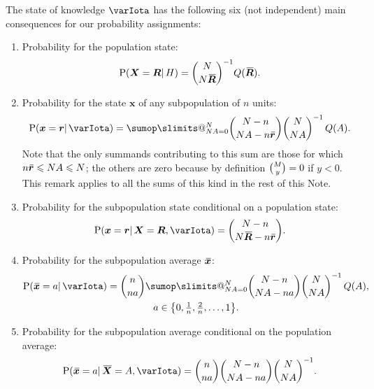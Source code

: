 \documentclass{article}
\makeatletter
\theoremstyle{remark}
\theoremstyle{innote}
\def\sum{\DOTSI\sumop\slimits@}
\renewcommand*{\|}{\mathpunct{|}}%
\renewcommand{\le}{\leqslant}%
\DeclarePairedDelimiter\set{\{}{\}}
\newcommand*{\p}{\mathrm{P}}%
\theoremstyle{simple}
\newcommand*{\widebar}[1]{{\mkern1.5mu\skew{2}\overline{\mkern-1.5mu#1\mkern-1.5mu}\mkern 1.5mu}}
\newcommand*{\av}{\widebar} %
\newcommand*{\sav}{\widebar} %
\newcommand*{\yxx}{x}%
\newcommand*{\yx}{\bm{\yxx}}%
\newcommand*{\yxs}{\sav{\yx}}%
\newcommand*{\yX}{\bm{X}}%
\newcommand*{\yXf}{\av{\yX}}%
\newcommand*{\yr}{\bm{r}}%
\newcommand*{\yrs}{\sav{\yr}}%
\newcommand*{\yR}{\bm{R}}%
\newcommand*{\yRf}{\av{\yR}}%
\newcommand*{\yH}{\varIota}
\makeatother
\begin{document}
The state of knowledge $\yH$ has the following six (not independent) main
consequences for our probability assignments:

\begin{enumerate}%
  \medskip\item\label{item:tot_plaus}Probability for the population state:
\begin{equation}
  \label{eq:joint_plaus_N_homog}
  \p(\yX = \yR \| H) = \binom{N}{N\yRf}^{-1} Q(\yRf).
\end{equation}

\medskip
\item\label{item:marginal}Probability for the state $\yx$ of any subpopulation
  of $n$ units:
\begin{equation}
  \label{eq:marginal}
    \p(\yx = \yr \| \yH) =
\sum_{N A =0}^{N} 
\binom{N-n}{N A-n\yrs}\binom{N}{N A}^{-1}\,
Q(A).
\end{equation}
Note that the only summands contributing to this sum are those for which
$n\yrs \le NA \le N$; the others are zero because by definition
$\tbinom{M}{y}=0$ if $y<0$. This remark applies to all the sums of this
kind in the rest of this Note.

\medskip
\item\label{item:conditional}Probability for the subpopulation
  state conditional on a population state:
\begin{equation}
  \label{eq:conditional_total_state}
  \p(\yx = \yr \| \yX = \yR, \yH)
=
\binom{N-n}{N \yRf-n \yrs}.
\end{equation}

\medskip
\item\label{item:marginal_average}Probability for the
  subpopulation average $\yxs$:
\begin{multline}
  \label{eq:subpop_average}
  \p(\yxs = a  \| \yH) = \binom{n}{n a}
 \sum_{N A=0}^{N}
\binom{N-n}{N A-n a}\binom{N}{N A}^{-1}\,
Q(A),
\\
a \in \set*{0,\tfrac{1}{n},\tfrac{2}{n},\dotsc,1}.
\end{multline}

\medskip
\item\label{item:conditional_average}Probability for the subpopulation
  average conditional on the population average:
\begin{equation}
  \label{eq:conditional_prob}
  \p(\yxs = a \| \yXf = A, \yH)
=
\binom{n}{n a}\binom{N-n}{N A-n a}\binom{N}{N A}^{-1}.
\end{equation}


\end{enumerate}
\end{document}
